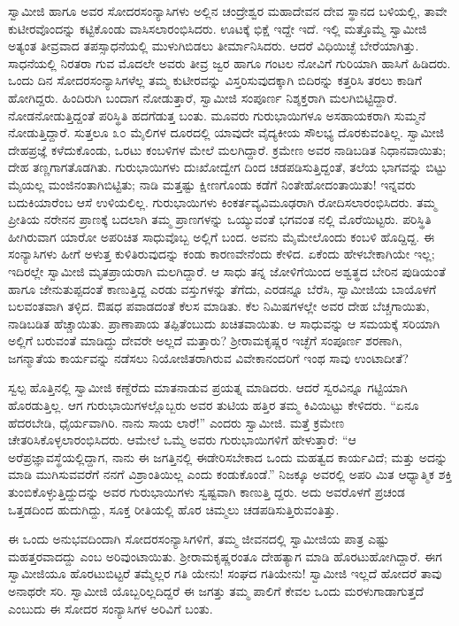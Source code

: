 ಸ್ವಾಮೀಜಿ ಹಾಗೂ ಅವರ ಸೋದರಸಂನ್ಯಾಸಿಗಳು ಅಲ್ಲಿನ ಚಂದ್ರೇಶ್ವರ ಮಹಾದೇವನ ದೇವ ಸ್ಥಾನದ ಬಳಿಯಲ್ಲಿ, ತಾವೇ ಕುಟೀರವೊಂದನ್ನು ಕಟ್ಟಿಕೊಂಡು ವಾಸಿಸಲಾರಂಭಿಸಿದರು. ಊಟಕ್ಕೆ ಭಿಕ್ಷೆ ಇದ್ದೇ ಇದೆ. ಇಲ್ಲಿ ಮತ್ತೊಮ್ಮೆ ಸ್ವಾಮೀಜಿ ಅತ್ಯಂತ ತೀವ್ರವಾದ ತಪಸ್ಸಾಧನೆಯಲ್ಲಿ ಮುಳುಗಿಬಿಡಲು ತೀರ್ಮಾನಿಸಿದರು. ಆದರೆ ವಿಧಿಯಿಚ್ಛೆ ಬೇರೆಯಾಗಿತ್ತು. ಸಾಧನೆಯಲ್ಲಿ ನಿರತರಾ ಗುವ ಮೊದಲೇ ಅವರು ತೀವ್ರ ಜ್ವರ ಹಾಗೂ ಗಂಟಲ ನೋವಿಗೆ ಗುರಿಯಾಗಿ ಹಾಸಿಗೆ ಹಿಡಿದರು. ಒಂದು ದಿನ ಸೋದರಸಂನ್ಯಾಸಿಗಳೆಲ್ಲ ತಮ್ಮ ಕುಟೀರವನ್ನು ವಿಸ್ತರಿಸುವುದಕ್ಕಾಗಿ ಬಿದಿರನ್ನು ಕತ್ತರಿಸಿ ತರಲು ಕಾಡಿಗೆ ಹೋಗಿದ್ದರು. ಹಿಂದಿರುಗಿ ಬಂದಾಗ ನೋಡುತ್ತಾರೆ, ಸ್ವಾಮೀಜಿ ಸಂಪೂರ್ಣ ನಿಶ್ಶಕ್ತರಾಗಿ ಮಲಗಿಬಿಟ್ಟಿದ್ದಾರೆ. ನೋಡನೋಡುತ್ತಿದ್ದಂತೆ ಪರಿಸ್ಥಿತಿ ಹದಗೆಡುತ್ತ ಬಂತು. ಮೂವರು ಗುರುಭಾಯಿಗಳೂ ಅಸಹಾಯಕರಾಗಿ ಸುಮ್ಮನೆ ನೋಡುತ್ತಿದ್ದಾರೆ. ಸುತ್ತಲೂ ೩೦ ಮೈಲಿಗಳ ದೂರದಲ್ಲಿ ಯಾವುದೇ ವೈದ್ಯಕೀಯ ಸೌಲಭ್ಯ ದೊರಕುವಂತಿಲ್ಲ. ಸ್ವಾಮೀಜಿ ದೇಹಪ್ರಜ್ಞೆ ಕಳೆದುಕೊಂಡು, ಒರಟು ಕಂಬಳಿಗಳ ಮೇಲೆ ಮಲಗಿದ್ದಾರೆ. ಕ್ರಮೇಣ ಅವರ ನಾಡಿಬಡಿತ ನಿಧಾನವಾಯಿತು; ದೇಹ ತಣ್ಣಗಾಗತೊಡಗಿತು. ಗುರುಭಾಯಿಗಳು ದುಃಖೋದ್ವೇಗ ದಿಂದ ಚಡಪಡಿಸುತ್ತಿದ್ದಂತೆ, ತಲೆಯ ಭಾಗವನ್ನು ಬಿಟ್ಟು ಮೈಯಲ್ಲ ಮಂಜಿನಂತಾಗಿಬಿಟ್ಟಿತು; ನಾಡಿ ಮತ್ತಷ್ಟು ಕ್ಷೀಣಗೊಂಡು ಕಡೆಗೆ ನಿಂತೇಹೋದಂತಾಯಿತು! ಇನ್ನವರು ಬದುಕಿಯಾರೆಂಬ ಆಸೆ ಉಳಿಯಲಿಲ್ಲ. ಗುರುಭಾಯಿಗಳು ಕಿಂಕರ್ತವ್ಯವಿಮೂಢರಾಗಿ ರೋದಿಸಲಾರಂಭಿಸಿದರು. ತಮ್ಮ ಪ್ರೀತಿಯ ನರೇನನ ಪ್ರಾಣಕ್ಕೆ ಬದಲಾಗಿ ತಮ್ಮ ಪ್ರಾಣಗಳನ್ನು ಒಯ್ಯುವಂತೆ ಭಗವಂತ ನಲ್ಲಿ ಮೊರೆಯಿಟ್ಟರು. ಪರಿಸ್ಥಿತಿ ಹೀಗಿರುವಾಗ ಯಾರೋ ಅಪರಿಚಿತ ಸಾಧುವೊಬ್ಬ ಅಲ್ಲಿಗೆ ಬಂದ. ಅವನು ಮೈಮೇಲೊಂದು ಕಂಬಳಿ ಹೊದ್ದಿದ್ದ. ಈ ಸಂನ್ಯಾಸಿಗಳು ಹೀಗೆ ಅಳುತ್ತ ಕುಳಿತಿರುವುದನ್ನು ಕಂಡು ಕಾರಣವೇನೆಂದು ಕೇಳಿದ. ಏಕೆಂದು ಹೇಳಬೇಕಾಗಿಯೇ ಇಲ್ಲ; ಇದಿರಲ್ಲೇ ಸ್ವಾಮೀಜಿ ಮೃತಪ್ರಾಯರಾಗಿ ಮಲಗಿದ್ದಾರೆ. ಆ ಸಾಧು ತನ್ನ ಜೋಳಿಗೆಯಿಂದ ಅಶ್ವತ್ಥದ ಬೇರಿನ ಪುಡಿಯಂತೆ ಹಾಗೂ ಜೇನುತುಪ್ಪದಂತೆ ಕಾಣುತ್ತಿದ್ದ ಎರಡು ವಸ್ತುಗಳನ್ನು ತೆಗೆದು, ಎರಡನ್ನೂ ಬೆರೆಸಿ, ಸ್ವಾಮೀಜಿಯ ಬಾಯೊಳಗೆ ಬಲವಂತವಾಗಿ ತಳ್ಳಿದ. ಔಷಧ ಪವಾಡದಂತೆ ಕೆಲಸ ಮಾಡಿತು. ಕೆಲ ನಿಮಿಷಗಳಲ್ಲೇ ಅವರ ದೇಹ ಬೆಚ್ಚಗಾಯಿತು, ನಾಡಿಬಡಿತ ಹೆಚ್ಚಾಯಿತು. ಪ್ರಾಣಾಪಾಯ ತಪ್ಪಿತೆಂಬುದು ಖಚಿತವಾಯಿತು. ಆ ಸಾಧುವನ್ನು ಆ ಸಮಯಕ್ಕೆ ಸರಿಯಾಗಿ ಅಲ್ಲಿಗೆ ಬರುವಂತೆ ಮಾಡಿದ್ದು ದೇವರೇ ಅಲ್ಲದೆ ಮತ್ತಾರು? ಶ್ರೀರಾಮಕೃಷ್ಣರ ಇಚ್ಛೆಗೆ ಸಂಪೂರ್ಣ ಶರಣಾಗಿ, ಜಗನ್ಮಾತೆಯ ಕಾರ್ಯವನ್ನು ನಡೆಸಲು ನಿಯೋಜಿತರಾಗಿರುವ ವಿವೇಕಾನಂದರಿಗೆ ಇಂಥ ಸಾವು ಉಂಟಾದೀತೆ?

ಸ್ವಲ್ಪ ಹೊತ್ತಿನಲ್ಲಿ ಸ್ವಾಮೀಜಿ ಕಣ್ದೆರೆದು ಮಾತನಾಡುವ ಪ್ರಯತ್ನ ಮಾಡಿದರು. ಆದರೆ ಸ್ವರವಿನ್ನೂ ಗಟ್ಟಿಯಾಗಿ ಹೊರಡುತ್ತಿಲ್ಲ. ಆಗ ಗುರುಭಾಯಿಗಳಲ್ಲೊಬ್ಬರು ಅವರ ತುಟಿಯ ಹತ್ತಿರ ತಮ್ಮ ಕಿವಿಯಿಟ್ಟು ಕೇಳಿದರು. “ಏನೂ ಹೆದರಬೇಡಿ, ಧೈರ್ಯವಾಗಿರಿ. ನಾನು ಸಾಯ ಲಾರೆ!” ಎಂದರು ಸ್ವಾಮೀಜಿ. ಮತ್ತೆ ಕ್ರಮೇಣ ಚೇತರಿಸಿಕೊಳ್ಳಲಾರಂಭಿಸಿದರು. ಆಮೇಲೆ ಒಮ್ಮೆ ಅವರು ಗುರುಭಾಯಿಗಳಿಗೆ ಹೇಳುತ್ತಾರೆ: “ಆ ಅರೆಪ್ರಜ್ಞಾವಸ್ಥೆಯಲ್ಲಿದ್ದಾಗ, ನಾನು ಈ ಜಗತ್ತಿನಲ್ಲಿ ಈಡೇರಿಸಬೇಕಾದ ಒಂದು ಮಹತ್ವದ ಕಾರ್ಯವಿದೆ; ಮತ್ತು ಅದನ್ನು ಮಾಡಿ ಮುಗಿಸುವವರೆಗೆ ನನಗೆ ವಿಶ್ರಾಂತಿಯಿಲ್ಲ ಎಂದು ಕಂಡುಕೊಂಡೆ.” ನಿಜಕ್ಕೂ ಅವರಲ್ಲಿ ಅಪರಿ ಮಿತ ಆಧ್ಯಾತ್ಮಿಕ ಶಕ್ತಿ ತುಂಬಿಕೊಳ್ಳುತ್ತಿದ್ದುದನ್ನು ಅವರ ಗುರುಭಾಯಿಗಳು ಸ್ವಷ್ಟವಾಗಿ ಕಾಣುತ್ತಿ ದ್ದರು. ಅದು ಅವರೊಳಗೆ ಪ್ರಚಂಡ ಒತ್ತಡದಿಂದ ಹುದುಗಿದ್ದು, ಸೂಕ್ತ ರೀತಿಯಲ್ಲಿ ಹೊರ ಚಿಮ್ಮಲು ಚಡಪಡಿಸುತ್ತಿರುವಂತಿತ್ತು.

ಈ ಒಂದು ಅನುಭವದಿಂದಾಗಿ ಸೋದರಸಂನ್ಯಾಸಿಗಳಿಗೆ, ತಮ್ಮ ಜೀವನದಲ್ಲಿ ಸ್ವಾಮೀಜಿಯ ಪಾತ್ರ ಎಷ್ಟು ಮಹತ್ತರವಾದದ್ದು ಎಂಬ ಅರಿವುಂಟಾಯಿತು. ಶ್ರೀರಾಮಕೃಷ್ಣರಂತೂ ದೇಹತ್ಯಾಗ ಮಾಡಿ ಹೊರಟುಹೋಗಿದ್ದಾರೆ. ಈಗ ಸ್ವಾಮೀಜಿಯೂ ಹೊರಟುಬಿಟ್ಟರೆ ತಮ್ಮೆಲ್ಲರ ಗತಿ ಯೇನು! ಸಂಘದ ಗತಿಯೇನು! ಸ್ವಾಮೀಜಿ ಇಲ್ಲದೆ ಹೋದರೆ ತಾವು ಅನಾಥರೇ ಸರಿ. ಸ್ವಾಮೀಜಿ ಯೊಬ್ಬರಿಲ್ಲದಿದ್ದರೆ ಈ ಜಗತ್ತು ತಮ್ಮ ಪಾಲಿಗೆ ಕೇವಲ ಒಂದು ಮರಳುಗಾಡಾಗುತ್ತದೆ ಎಂಬುದು ಈ ಸೋದರ ಸಂನ್ಯಾಸಿಗಳ ಅರಿವಿಗೆ ಬಂತು.

